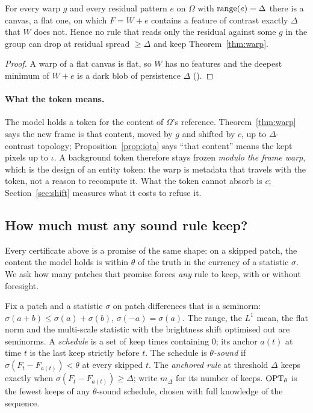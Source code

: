 \begin{proposition}[tightness]
\label{prop:tight}
For every warp $g$ and every residual pattern $e$ on $\Omega$ with $\operatorname{range}(e) = \Delta$ there is a canvas, a flat one, on which $F = W + e$ contains a feature of contrast exactly $\Delta$ that $W$ does not. Hence no rule that reads only the residual against some $g$ in the group can drop at residual spread $\ge \Delta$ and keep Theorem~\ref{thm:warp}.
\end{proposition}

\begin{proof}
A warp of a flat canvas is flat, so $W$ has no features and the deepest minimum of $W + e$ is a dark blob of persistence $\Delta$ (\citealp[Proposition 2]{nair2026certifiedskip}).
\end{proof}

\paragraph{What the token means.} The model holds a token for the content of $\Omega$'s reference. Theorem~\ref{thm:warp} says the new frame is that content, moved by $g$ and shifted by $c$, up to $\Delta$-contrast topology; Proposition~\ref{prop:iota} says ``that content'' means the kept pixels up to $\iota$. A background token therefore stays frozen \emph{modulo the frame warp}, which is the design of an entity token: the warp is metadata that travels with the token, not a reason to recompute it. What the token cannot absorb is $c$; Section~\ref{sec:shift} measures what it costs to refuse it.

\subsection{How much must any sound rule keep?}
\label{sec:opt}

Every certificate above is a promise of the same shape: on a skipped patch, the content the model holds is within $\theta$ of the truth in the currency of a statistic $\sigma$. We ask how many patches that promise forces \emph{any} rule to keep, with or without foresight.

\begin{definition}
Fix a patch and a statistic $\sigma$ on patch differences that is a seminorm: $\sigma(a + b) \le \sigma(a) + \sigma(b)$, $\sigma(-a) = \sigma(a)$. The range, the $L^1$ mean, the flat norm and the multi-scale statistic with the brightness shift optimised out are seminorms. A \emph{schedule} is a set of keep times containing $0$; its anchor $a(t)$ at time $t$ is the last keep strictly before $t$. The schedule is \emph{$\theta$-sound} if $\sigma(F_t - F_{a(t)}) < \theta$ at every skipped $t$. The \emph{anchored rule} at threshold $\Delta$ keeps exactly when $\sigma(F_t - F_{a(t)}) \ge \Delta$; write $m_\Delta$ for its number of keeps. $\mathrm{OPT}_\theta$ is the fewest keeps of any $\theta$-sound schedule, chosen with full knowledge of the sequence.
\end{definition}

